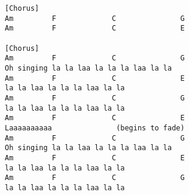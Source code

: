 \documentclass{article}
\begin{document}
\begin{verbatim}
[Chorus]
Am         F             C               G
Am         F             C               E

[Chorus]
Am         F             C               G
Oh singing la la laa la la la laa la la
Am         F             C               E
la la laa la la la laa la la
Am         F             C               G
la la laa la la la laa la la
Am         F             C               E
Laaaaaaaaaa               (begins to fade)
Am         F             C               G
Oh singing la la laa la la la laa la la
Am         F             C               E
la la laa la la la laa la la
Am         F             C               G
la la laa la la la laa la la
\end{verbatim}
\end{document}
